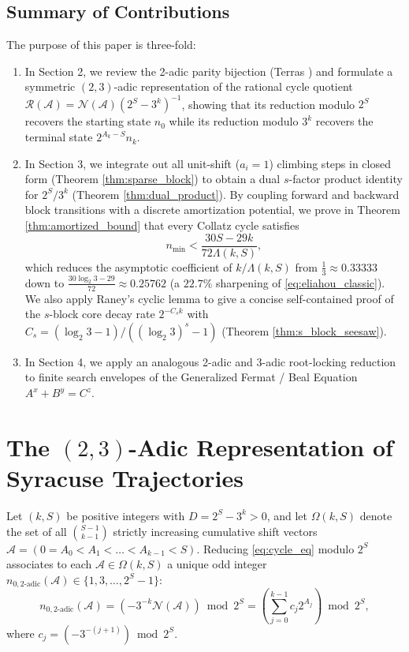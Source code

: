 \documentclass[11pt, a4paper]{amsart}
\theoremstyle{definition}
\newcommand{\N}{\mathcal{N}}
\newcommand{\A}{\mathcal{A}}
\newcommand{\Rcal}{\mathcal{R}}
\begin{document}
\subsection{Summary of Contributions}
The purpose of this paper is three-fold:
\begin{enumerate}
    \item In Section 2, we review the 2-adic parity bijection (Terras \cite{Terras1976}) and formulate a symmetric $(2,3)$-adic representation of the rational cycle quotient $\Rcal(\A) = \N(\A)(2^S - 3^k)^{-1}$, showing that its reduction modulo $2^S$ recovers the starting state $n_0$ while its reduction modulo $3^k$ recovers the terminal state $2^{A_k-S} n_k$.
    \item In Section 3, we integrate out all unit-shift ($a_i = 1$) climbing steps in closed form (Theorem \ref{thm:sparse_block}) to obtain a dual $s$-factor product identity for $2^S / 3^k$ (Theorem \ref{thm:dual_product}). By coupling forward and backward block transitions with a discrete amortization potential, we prove in Theorem \ref{thm:amortized_bound} that every Collatz cycle satisfies
    \begin{equation}\label{eq:main_amortized}
    n_{\min} < \frac{30 S - 29 k}{72 \Lambda(k, S)},
    \end{equation}
    which reduces the asymptotic coefficient of $k / \Lambda(k, S)$ from $\frac{1}{3} \approx 0.33333$ down to $\frac{30 \log_2 3 - 29}{72} \approx 0.25762$ (a $22.7\%$ sharpening of \eqref{eq:eliahou_classic}). We also apply Raney's cyclic lemma to give a concise self-contained proof of the $s$-block core decay rate $2^{-C_s k}$ with $C_s = (\log_2 3 - 1)/((\log_2 3)^s - 1)$ (Theorem \ref{thm:s_block_seesaw}).
    \item In Section 4, we apply an analogous 2-adic and 3-adic root-locking reduction to finite search envelopes of the Generalized Fermat / Beal Equation $A^x + B^y = C^z$.
\end{enumerate}

\section{The $(2,3)$-Adic Representation of Syracuse Trajectories}

Let $(k, S)$ be positive integers with $D = 2^S - 3^k > 0$, and let $\Omega(k, S)$ denote the set of all $\binom{S-1}{k-1}$ strictly increasing cumulative shift vectors $\A = (0 = A_0 < A_1 < \dots < A_{k-1} < S)$. Reducing \eqref{eq:cycle_eq} modulo $2^S$ associates to each $\A \in \Omega(k, S)$ a unique odd integer $n_{0,\text{2-adic}}(\A) \in \{1, 3, \dots, 2^S - 1\}$:
\begin{equation}\label{eq:n0_2adic}
n_{0,\text{2-adic}}(\A) = \left( -3^{-k} \N(\A) \right) \bmod 2^S = \left( \sum_{j=0}^{k-1} c_j 2^{A_j} \right) \bmod 2^S,
\end{equation}
where $c_j = (-3^{-(j+1)}) \bmod 2^S$.
\end{document}
